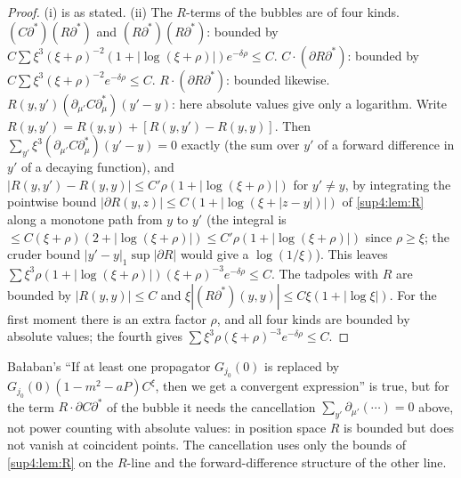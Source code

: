 \begin{proof}
(i) is as stated. (ii) The $R$-terms of the bubbles are of four kinds. $(C\partial^*)(R\partial^*)$ and $(R\partial^*)(R\partial^*)$: bounded by $C\sum\xi^3(\xi+\rho)^{-2}(1+|\log(\xi+\rho)|)e^{-\delta\rho}\le C$. $C\cdot(\partial R\partial^*)$: bounded by $C\sum\xi^3(\xi+\rho)^{-2}e^{-\delta\rho}\le C$. $R\cdot(\partial R\partial^*)$: bounded likewise. $R(y,y')(\partial_{\mu'}C\partial_\mu^*)(y'-y)$: here absolute values give only a logarithm. Write $R(y,y')=R(y,y)+[R(y,y')-R(y,y)]$. Then $\sum_{y'}\xi^3(\partial_{\mu'}C\partial_\mu^*)(y'-y)=0$ exactly (the sum over $y'$ of a forward difference in $y'$ of a decaying function), and $|R(y,y')-R(y,y)|\le C'\rho(1+|\log(\xi+\rho)|)$ for $y'\ne y$, by integrating the pointwise bound $|\partial R(y,z)|\le C(1+|\log(\xi+|z-y|)|)$ of \cref{sup4:lem:R} along a monotone path from $y$ to $y'$ (the integral is $\le C(\xi+\rho)(2+|\log(\xi+\rho)|)\le C'\rho(1+|\log(\xi+\rho)|)$ since $\rho\ge\xi$; the cruder bound $|y'-y|_1\sup|\partial R|$ would give a $\log(1/\xi)$). This leaves $\sum\xi^3\rho(1+|\log(\xi+\rho)|)(\xi+\rho)^{-3}e^{-\delta\rho}\le C$. The tadpoles with $R$ are bounded by $|R(y,y)|\le C$ and $\xi|(R\partial^*)(y,y)|\le C\xi(1+|\log\xi|)$. For the first moment there is an extra factor $\rho$, and all four kinds are bounded by absolute values; the fourth gives $\sum\xi^3\rho(\xi+\rho)^{-3}e^{-\delta\rho}\le C$.
\end{proof}

\begin{remark}\label{sup4:rem:S2111}
Ba{\l}aban's ``If at least one propagator $G_{j_0}(0)$ is replaced by $G_{j_0}(0)(1-m^2-aP)C^\xi$, then we get a convergent expression'' \cite[p.~441]{Ba3} is true, but for the term $R\cdot\partial C\partial^*$ of the bubble it needs the cancellation $\sum_{y'}\partial_{\mu'}(\cdots)=0$ above, not power counting with absolute values: in position space $R$ is bounded but does not vanish at coincident points. The cancellation uses only the bounds of \cref{sup4:lem:R} on the $R$-line and the forward-difference structure of the other line.
\end{remark}

